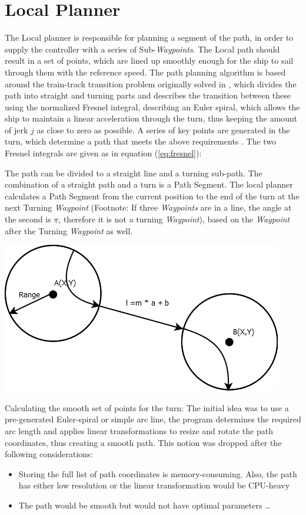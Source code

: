 \section{Local Planner}

The Local planner is responsible for planning a segment of the path, in order to supply the controller with a series of Sub-\emph{Waypoints}. The Local path should result in a set of points, which are lined up smoothly enough for the ship to sail through them with the reference speed.
The path planning algorithm is based around the train-track transition problem originally solved in \citep{Art:1}, which divides the path into straight and turning parts and describes the transition between these using the normalized Fresnel integral, describing an Euler spiral, which allows the ship to maintain a linear acceleration through the turn, thus keeping the amount of jerk $j$ as close to zero as possible. A series of key points are generated in the turn, which determine a path that meets the above requirements \citep{Art:2}. The two Fresnel integrals are given as in equation (\ref{eq:fresnel}):

The path can be divided to a straight line and a turning sub-path. The combination of a straight path and a turn is a Path Segment. The local planner calculates a Path Segment from the current position to the end of the turn at the next Turning \emph{Waypoint} (Footnote: If three \emph{Waypoints} are in a line, the angle at the second is $\pi$, therefore it is not a turning \emph{Waypoint}), based on the \emph{Waypoint} after the Turning \emph{Waypoint} as well.

\includegraphics[width = \textwidth]{img/LocalPlannerFigures/StraightRoute.png}

Calculating the smooth set of points for the turn:
The initial idea was to use a pre-generated Euler-spiral or simple arc line, the program determines the required arc length and applies linear transformations to resize and rotate the path coordinates, thus creating a smooth path.
This notion was dropped after the following considerations:
\begin{itemize}
\item Storing the full list of path coordinates is memory-consuming. Also, the path has either low resolution or the linear transformation would be CPU-heavy
\item The path would be smooth but would not have optimal parameters \ldots
\end{itemize}

